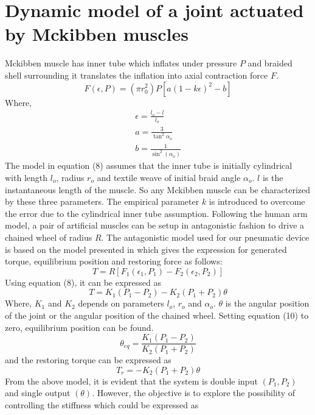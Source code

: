 \documentclass[conference]{IEEEtran}
\begin{document}
\section{Dynamic model of a joint actuated by Mckibben muscles}
Mckibben muscle has inner tube which inflates under pressure $P$ and braided shell surrounding it translates the inflation into axial contraction force $F$.
\begin{equation}
F(\epsilon, P) = (\pi r_{0}^2)P[a(1-k\epsilon)^2-b]
\end{equation}
Where,
\begin{align*}
\epsilon = \frac{l_{o}-l}{l_{o}}\\
a = \frac{3}{\tan^2 {\alpha_{o}}}\\
b = \frac{1}{\sin^2(\alpha_{o})}
\end{align*}
The model in equation (8) assumes that the inner tube is initially cylindrical with length $l_{o}$, radius $r_{o}$ and textile weave of initial braid angle $\alpha_{o}$. $l$ is the instantaneous length of the muscle. So any Mckibben muscle can be characterized by these three parameters. The empirical parameter $k$ is introduced to overcome the error due to the cylindrical inner tube assumption.
Following the human arm model, a pair of artificial muscles can be setup in antagonistic fashion to drive a chained wheel of radius $R$. The antagonistic model used for our pneumatic device is based on the model presented in \cite{tondumuscle} which gives the expression for generated torque, equilibrium position and restoring force as follows:
\begin{equation}
T = R[F_{1}(\epsilon_{1}, P_{1})-F_{2}(\epsilon_{2}, P_{2})]
\end{equation}
Using equation (8), it can be expressed as
\begin{equation}
T = K_{1}(P_{1}-P_{2}) - K_{2}(P_{1}+P_{2})\theta
\end{equation}
Where, $K_{1}$ and $K_{2}$ depends on parameters $l_{o}$, $r_{o}$ and $\alpha_{o}$. $\theta$ is the angular position of the joint or the angular position of the chained wheel.
Setting equation (10) to zero, equilibrium position can be found.
\begin{equation}
\theta_{eq} = \frac{K_{1}(P_{1}-P_{2})}{K_{2}(P_{1}+P_{2})}
\end{equation}
and the restoring torque can be expressed as
\begin{equation}
T_{r} = -K_{2}(P_{1}+P_{2})\theta
\end{equation}
From the above model, it is evident that the system is double input $(P_{1}, P_{2})$ and single output $(\theta)$. However, the objective is to explore the possibility of controlling the stiffness which could be expressed as
\end{document}
